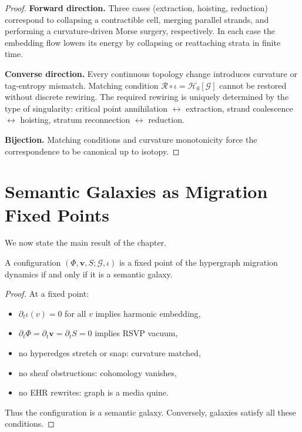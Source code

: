 \begin{proof}
\textbf{Forward direction.}
Three cases (extraction, hoisting, reduction) correspond to collapsing a
contractible cell, merging parallel strands, and performing a curvature-driven
Morse surgery, respectively.  
In each case the embedding flow lowers its energy by collapsing or reattaching
strata in finite time.

\textbf{Converse direction.}
Every continuous topology change introduces curvature or tag-entropy mismatch.
Matching condition $\mathcal{R}\circ\iota = \mathcal{H}_0[\mathcal{G}]$ cannot
be restored without discrete rewiring.  
The required rewiring is uniquely determined by the type of singularity:
critical point annihilation $\leftrightarrow$ extraction,  
strand coalescence $\leftrightarrow$ hoisting,  
stratum reconnection $\leftrightarrow$ reduction.

\textbf{Bijection.}
Matching conditions and curvature monotonicity force the correspondence to be
canonical up to isotopy.
\end{proof}

\section{Semantic Galaxies as Migration Fixed Points}

We now state the main result of the chapter.

\begin{theorem}
A configuration $(\Phi,\mathbf{v},S;\mathcal{G},\iota)$ is a fixed point of the
hypergraph migration dynamics if and only if it is a semantic galaxy.
\end{theorem}

\begin{proof}
At a fixed point:
\begin{itemize}
\item $\partial_t\iota(v)=0$ for all $v$ implies harmonic embedding,
\item $\partial_t\Phi=\partial_t\mathbf{v}=\partial_t S = 0$ implies RSVP vacuum,
\item no hyperedges stretch or snap: curvature matched,
\item no sheaf obstructions: cohomology vanishes,
\item no EHR rewrites: graph is a media quine.
\end{itemize}
Thus the configuration is a semantic galaxy.  
Conversely, galaxies satisfy all these conditions.
\end{proof}

